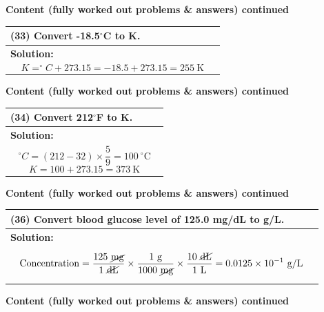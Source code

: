 \documentclass{article}
\begin{document}
\newpage
\noindent
{\large \textbf{Content (fully worked out problems \& answers) continued}} \\[0.2em]
\begin{tabular}{|p{0.9\linewidth}|}
\hline
\vspace{0.2cm}

\textbf{(33)} Convert -18.5$^\circ$C to K. \\
\hline
\textbf{Solution:} \\
\[
K = ^\circ C + 273.15 = -18.5 + 273.15 = 255~\text{K}
\]
\\
\hline
\end{tabular}
\newpage
\noindent
{\large \textbf{Content (fully worked out problems \& answers) continued}} \\[0.2em]
\begin{tabular}{|p{0.9\linewidth}|}
\hline
\vspace{0.2cm}

\textbf{(34)} Convert 212$^\circ$F to K. \\
\hline
\textbf{Solution:} \\
\[
^\circ C = \left(212-32\right)\times \frac{5}{9} = 100~^\circ\text{C}
\]
\[
K = 100 + 273.15 = 373~\text{K}
\]
\\
\hline
\end{tabular}

\newpage
\noindent
{\large \textbf{Content (fully worked out problems \& answers) continued}} \\[0.2em]
\begin{tabular}{|p{0.9\linewidth}|}
\hline
\vspace{0.2cm}

\textbf{(36)} Convert blood glucose level of 125.0 mg/dL to g/L. \\
\hline
\textbf{Solution:} \\
\[
\text{Concentration} = \frac{125~\cancel{\text{mg}}}{1~\cancel{\text{dL}}} \times \frac{1~\text{g}}{1000~\cancel{\text{mg}}} \times \frac{10~\cancel{\text{dL}}}{1~\text{L}} = 0.0125 \times 10^{-1}~\text{g/L}
\]
\\
\hline
\end{tabular}
\newpage
{\large \textbf{Content (fully worked out problems \& answers) continued}} \\[0.2em]
\end{document}
